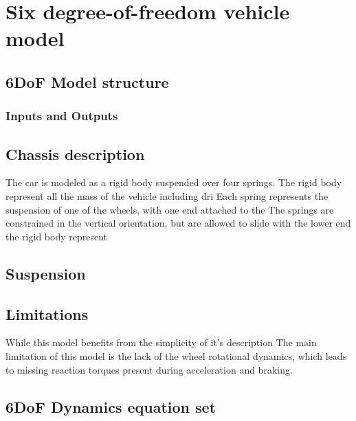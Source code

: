\chapter{Six degree-of-freedom vehicle model}
\label{chap:6dof}

\section{6DoF Model structure}
\label{sec:6dofconcept}
\subsection{Inputs and Outputs}
\section{Chassis description}
\label{sec:body}
The car is modeled as a rigid body suspended over four springs.
The rigid body represent all the mass of the vehicle including dri
Each spring represents the suspension of one of the wheels, with one end attached to the
The springs are constrained in the vertical orientation, but are allowed to slide with the lower end
the rigid body represent
\section{Suspension}
\label{sec:suspension}
\section{Limitations}
\label{sec:6doflimits}
While this model benefits from the simplicity of it's description
The main limitation of this model is the lack of the wheel rotational dynamics, which leads to missing reaction torques present during acceleration and braking.
\section{6DoF Dynamics equation set}
\label{sec:6dofeq}
